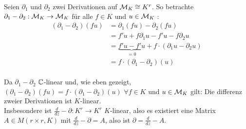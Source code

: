 Seien $\partial_1$ und $\partial_2$ zwei Derivationen auf $\mathcal{M}_K\cong
K^r$. So betrachte $\partial_1-\partial_2:\mathcal{M}_K\rightarrow\mathcal{M}_K$ für alle $f\in
K$ und $u\in \mathcal{M}_K$ :
\begin{align*}
  (\partial_1-\partial_2)(fu) &= \partial_1(fu)-\partial_2(fu)\\
  &= f'u+f\partial_1u-f'u-f\partial_2u\\
  &= \underset{=0}{\underbrace{f'u-f'u}}+f\cdot(\partial_1u-\partial_2u)\\
  &= f\cdot(\partial_1-\partial_2)(u)\\
\end{align*}
\begin{lem}
  Da $\partial_1-\partial_2$ $\mathbb{C}$-linear und, wie eben gezeigt,
  $(\partial_1-\partial_2)(fu)=f\cdot(\partial_1-\partial_2)(u)$ $\forall f\in
  K$ und $u\in\mathcal{M}_K$ gilt: Die differenz zweier Derivationen ist
  $K$-linear.\\
  Insbesondere ist $\frac{d}{dz}-\partial:K^r\rightarrow K^r$ $K$-linear, also
  es existiert eine Matrix $A\in M(r\times r,K)$ mit $\frac{d}{dz}-\partial=A$,
  also ist $\partial=\frac{d}{dz}-A$.
\end{lem}




